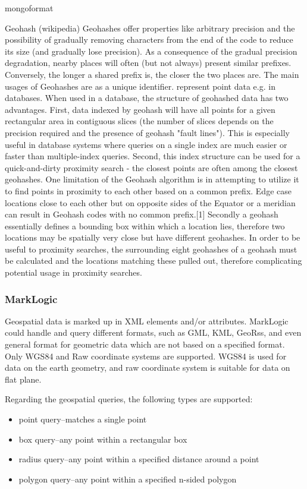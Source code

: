 \documentclass[a4paper,12pt]{article}
\begin{document}
mongoformat

Geohash (wikipedia)
Geohashes offer properties like arbitrary precision and the possibility of gradually removing characters from the end of the code to reduce its size (and gradually lose precision).
As a consequence of the gradual precision degradation, nearby places will often (but not always) present similar prefixes. Conversely, the longer a shared prefix is, the closer the two places are.
The main usages of Geohashes are
as a unique identifier.
represent point data e.g. in databases.
When used in a database, the structure of geohashed data has two advantages. First, data indexed by geohash will have all points for a given rectangular area in contiguous slices (the number of slices depends on the precision required and the presence of geohash "fault lines"). This is especially useful in database systems where queries on a single index are much easier or faster than multiple-index queries. Second, this index structure can be used for a quick-and-dirty proximity search - the closest points are often among the closest geohashes.
One limitation of the Geohash algorithm is in attempting to utilize it to find points in proximity to each other based on a common prefix. Edge case locations close to each other but on opposite sides of the Equator or a meridian can result in Geohash codes with no common prefix.[1]
Secondly a geohash essentially defines a bounding box within which a location lies, therefore two locations may be spatially very close but have different geohashes. In order to be useful to proximity searches, the surrounding eight geohashes of a geohash must be calculated and the locations matching these pulled out, therefore complicating potential usage in proximity searches.

\subsubsection{MarkLogic}
Geospatial data is marked up in XML elements and/or attributes. MarkLogic could handle and query different formats, such as GML, KML, GeoRss, and even general format for geometric data which are not based on a specified format. Only WGS84 and Raw coordinate systems are supported. WGS84 is used for data on the earth geometry, and raw coordinate system is suitable for data on flat plane.

Regarding the geospatial queries, the following types are supported:
\begin{itemize}
\item point query--matches a single point
\item box query--any point within a rectangular box
\item radius query--any point within a specified distance around a point
\item polygon query--any point within a specified n-sided polygon
\end{itemize}
\end{document}
